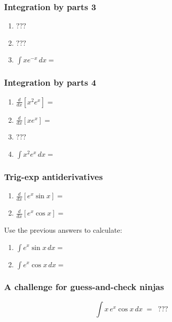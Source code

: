 \documentclass[14pt]{beamer}
\newcommand {\DS} [1] {${\displaystyle #1}$}
\newcommand{\vv}{\vspace{.1cm}}
\begin{document}
\begin{frame}[t]
\frametitle{Integration by parts 3}

\begin{enumerate}
	\item \DS{???  }
	\vspace{.3cm}
	\item \DS{???  }
	\vspace{.3cm}
	\item \DS{\int x e^{-x} \, dx = }
\end{enumerate}

\end{frame}
\begin{frame}[t]
\frametitle{Integration by parts 4}

\begin{enumerate}
	\item  \DS{\frac{d}{dx} \left[ x^2 e^x \right] = }
	\vv \vv
	\item  \DS{\frac{d}{dx} \left[ x e^x \right] = }
	\vspace{.5cm}
	\item \DS{???  }
	\vspace{.5cm}
	\item \DS{\int x^2 e^x \, dx = }
\end{enumerate}

\end{frame}
\begin{frame}[t]
\frametitle{Trig-exp antiderivatives}

\begin{enumerate}
	\item \DS{\frac{d}{dx} \left[ e^x \sin x \right]=}
	\vv \vv
	\item \DS{\frac{d}{dx} \left[ e^x \cos x \right]=}
\end{enumerate}
\vspace{.5cm}
Use the previous answers to calculate:
\vspace{.3cm}
\begin{enumerate}
\addtocounter{enumi}{2}
	\item \DS{\int e^x \sin x \, dx = }
	\vv \vv
	\item \DS{\int e^x \cos x \, dx = }
\end{enumerate}

\end{frame}
\begin{frame}[t]
\frametitle{A challenge for guess-and-check ninjas}
	$$
		\int x \, e^x \cos x \, dx \; = \; \; ???
	$$

\end{frame}
\end{document}
